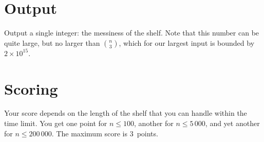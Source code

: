 \section*{Output}

Output a single integer: the messiness of the shelf.
Note that this number can be quite large, but no larger than $\binom{n}{3}$, which for our largest input is bounded by $2 \times 10^{15}$.

\section*{Scoring}

Your score depends on the length of the shelf that you can handle within the time limit.
You get one point for $n\leq 100$, another for $n\leq 5\,000$, and yet another for $n\leq 200\,000$. 
The maximum score is $3$~points.

